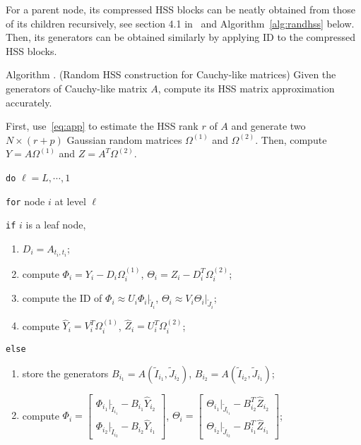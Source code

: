 \documentclass[times]{nlaauth}
\newcounter{algorithm}
\newenvironment{algorithm}{\refstepcounter{algorithm}\vspace{1ex}
  {\sc Algorithm \thealgorithm.}\hspace{0.3em}\parindent=0pt}{\vspace{1ex}}
\begin{document}
For a parent node, its compressed HSS blocks can be neatly obtained from those of its
children recursively, see section 4.1 in~\cite{rand-hss} and Algorithm~\ref{alg:randhss} below.
Then, its generators can be obtained similarly by applying ID to the compressed HSS blocks.

\begin{algorithm}
\label{alg:randhss}
(Random HSS construction for Cauchy-like matrices)
Given the generators of Cauchy-like matrix $A$, compute its HSS matrix approximation accurately.

First, use~\eqref{eq:app} to estimate the HSS rank $r$ of $A$ and generate two $N\times (r+p)$ Gaussian random matrices
$\Omega^{(1)}$ and $\Omega^{(2)}$. Then, compute $Y=A\Omega^{(1)}$ and $Z=A^T \Omega^{(2)}$.

\begin{description}

\item \texttt{do} $\ell=L,\cdots,1$
  \item[\quad] \texttt{for} node $i$ at level $\ell$
    \item[\qquad] \texttt{if} $i$ is a leaf node,
      \begin{enumerate}
        \item $D_i=A_{t_i,t_i}$;

        \item compute $\Phi_i=Y_i-D_i\Omega_i^{(1)}$, $\Theta_i=Z_i-D_i^T \Omega_i^{(2)}$;

        \item compute the ID of  $\Phi_i \approx U_i \Phi_i|_{\tilde{I}_i}$, $\Theta_i \approx V_i \Theta_i|_{\tilde{J}_i} $;

        \item compute $\widehat{Y}_i = V_i^T \Omega_i^{(1)}$, $\widehat{Z}_i = U_i^T \Omega_i^{(2)}$;
       \end{enumerate}

    \item[\qquad] \texttt{else}
      \begin{enumerate}

        \item store the generators $B_{i_1} = A(\tilde{I}_{i_1},\tilde{J}_{i_2})$, $B_{i_2} = A(\tilde{I}_{i_2},\tilde{J}_{i_1})$;

        \item compute $\Phi_i=\begin{bmatrix} \Phi_{i_1}|_{\tilde{I}_{i_1}}-B_{i_1}\widehat{Y}_{i_2} \\ \Phi_{i_2}|_{\tilde{I}_{i_2}}-B_{i_2}\widehat{Y}_{i_1} \end{bmatrix}$, \quad
          $\Theta_i=\begin{bmatrix} \Theta_{i_1}|_{\tilde{J}_{i_1}}-B_{i_2}^T\widehat{Z}_{i_2} \\ \Theta_{i_2}|_{\tilde{J}_{i_2}}-B_{i_1}^T\widehat{Z}_{i_1} \end{bmatrix}$;


\end{enumerate}
\end{description}
\end{algorithm}
\end{document}
